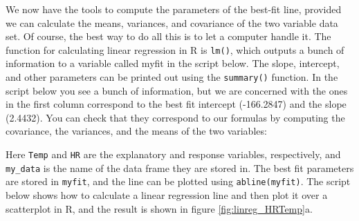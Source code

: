 \documentclass[
  letterpaper,
  DIV=11,
  numbers=noendperiod]{scrreprt}
\newenvironment{Shaded}{\begin{snugshade}}{\end{snugshade}}
\newcommand{\NormalTok}[1]{\textcolor[rgb]{0.00,0.23,0.31}{#1}}
\begin{document}
\label{sec:comp6}

We now have the tools to compute the parameters of the best-fit line,
provided we can calculate the means, variances, and covariance of the
two variable data set. Of course, the best way to do all this is to let
a computer handle it. The function for calculating linear regression in
R is \texttt{lm()}, which outputs a bunch of information to a variable
called myfit in the script below. The slope, intercept, and other
parameters can be printed out using
the \texttt{summary()} function. In the script below you see a bunch of
information, but we are concerned with the ones in the first column
correspond to the best fit intercept (-166.2847) and the slope (2.4432).
You can check that they correspond to our formulas by computing the
covariance, the variances, and the means of the two variables:

\begin{Shaded}
\end{Shaded}

Here \texttt{Temp} and \texttt{HR} are the explanatory and response
variables, respectively, and \texttt{my\_data} is the name of the data
frame they are stored in. The best fit parameters are stored in
\texttt{myfit}, and the line can be plotted using
\texttt{abline(myfit)}. The script below shows how to calculate a linear
regression line and then plot it over a scatterplot in R, and the result
is shown in figure \ref{fig:linreg_HRTemp}a.

\begin{Shaded}
\end{Shaded}
\end{document}

